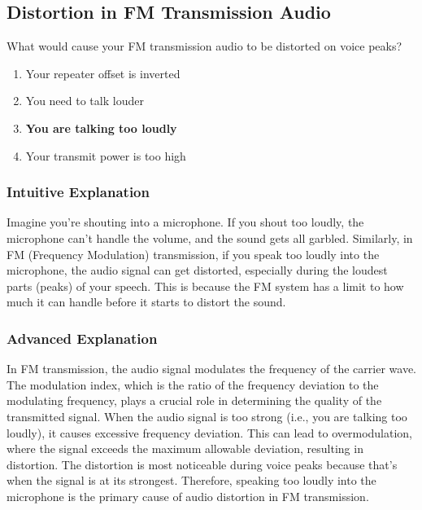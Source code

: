 \subsection{Distortion in FM Transmission Audio}
\label{T2B05}

\begin{tcolorbox}[colback=gray!10!white,colframe=black!75!black,title=T2B05]
What would cause your FM transmission audio to be distorted on voice peaks?
\begin{enumerate}[noitemsep]
    \item Your repeater offset is inverted
    \item You need to talk louder
    \item \textbf{You are talking too loudly}
    \item Your transmit power is too high
\end{enumerate}
\end{tcolorbox}

\subsubsection*{Intuitive Explanation}
Imagine you're shouting into a microphone. If you shout too loudly, the microphone can't handle the volume, and the sound gets all garbled. Similarly, in FM (Frequency Modulation) transmission, if you speak too loudly into the microphone, the audio signal can get distorted, especially during the loudest parts (peaks) of your speech. This is because the FM system has a limit to how much it can handle before it starts to distort the sound.

\subsubsection*{Advanced Explanation}
In FM transmission, the audio signal modulates the frequency of the carrier wave. The modulation index, which is the ratio of the frequency deviation to the modulating frequency, plays a crucial role in determining the quality of the transmitted signal. When the audio signal is too strong (i.e., you are talking too loudly), it causes excessive frequency deviation. This can lead to overmodulation, where the signal exceeds the maximum allowable deviation, resulting in distortion. The distortion is most noticeable during voice peaks because that's when the signal is at its strongest. Therefore, speaking too loudly into the microphone is the primary cause of audio distortion in FM transmission.